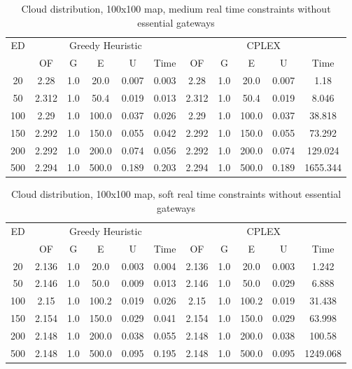 \begin{table}[htb]
	\centering
	\begin{tabular}{|c|c|c|c|c|c|c|c|c|c|c|}
		\hline
		\multirow{2}{*}{ED} & \multicolumn{5}{c|}{Greedy Heuristic} & \multicolumn{5}{c|}{CPLEX}\\ 
		\cline{2-11}
& OF & G & E & U & Time & OF & G & E & U & Time\\ 
		\hline
		20 & 2.28 & 1.0 & 20.0 & 0.007 & 0.003 & 2.28 & 1.0 & 20.0 & 0.007 & 1.18 \\ 
		50 & 2.312 & 1.0 & 50.4 & 0.019 & 0.013 & 2.312 & 1.0 & 50.4 & 0.019 & 8.046 \\ 
		100 & 2.29 & 1.0 & 100.0 & 0.037 & 0.026 & 2.29 & 1.0 & 100.0 & 0.037 & 38.818 \\ 
		150 & 2.292 & 1.0 & 150.0 & 0.055 & 0.042 & 2.292 & 1.0 & 150.0 & 0.055 & 73.292 \\ 
		200 & 2.292 & 1.0 & 200.0 & 0.074 & 0.056 & 2.292 & 1.0 & 200.0 & 0.074 & 129.024 \\ 
		500 & 2.294 & 1.0 & 500.0 & 0.189 & 0.203 & 2.294 & 1.0 & 500.0 & 0.189 & 1655.344 \\ 
		\hline 
	\end{tabular} 
	\caption{Cloud distribution, 100x100 map, medium real time constraints without essential gateways} 
	\label{tab:cloud_medium_n_esc_100} 
\end{table} 

\begin{table}[htb]
	\centering
	\begin{tabular}{|c|c|c|c|c|c|c|c|c|c|c|}
		\hline
		\multirow{2}{*}{ED} & \multicolumn{5}{c|}{Greedy Heuristic} & \multicolumn{5}{c|}{CPLEX}\\ 
		\cline{2-11}
& OF & G & E & U & Time & OF & G & E & U & Time\\ 
		\hline
		20 & 2.136 & 1.0 & 20.0 & 0.003 & 0.004 & 2.136 & 1.0 & 20.0 & 0.003 & 1.242 \\ 
		50 & 2.146 & 1.0 & 50.0 & 0.009 & 0.013 & 2.146 & 1.0 & 50.0 & 0.029 & 6.888 \\ 
		100 & 2.15 & 1.0 & 100.2 & 0.019 & 0.026 & 2.15 & 1.0 & 100.2 & 0.019 & 31.438 \\ 
		150 & 2.154 & 1.0 & 150.0 & 0.029 & 0.041 & 2.154 & 1.0 & 150.0 & 0.029 & 63.998 \\ 
		200 & 2.148 & 1.0 & 200.0 & 0.038 & 0.055 & 2.148 & 1.0 & 200.0 & 0.038 & 100.58 \\ 
		500 & 2.148 & 1.0 & 500.0 & 0.095 & 0.195 & 2.148 & 1.0 & 500.0 & 0.095 & 1249.068 \\ 
		\hline 
	\end{tabular} 
	\caption{Cloud distribution, 100x100 map, soft real time constraints without essential gateways} 
	\label{tab:cloud_soft_n_esc_100} 
\end{table} 

